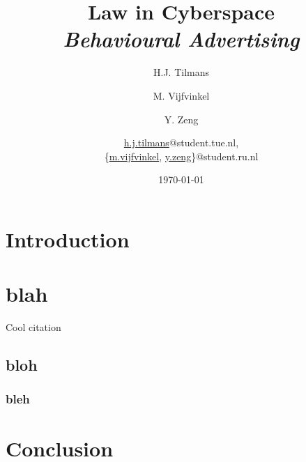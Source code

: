\documentclass[11pt]{article}
\title{\textbf{Law in Cyberspace\\ \emph{Behavioural Advertising}}}
\author{
	H.J. Tilmans
	\and M. Vijfvinkel
	\and Y. Zeng
	\and
	\href{mailto:h.j.tilmans@student.tue.nl}{h.j.tilmans}@student.tue.nl,\\
	\{\href{mailto:m.vijfvinkel@student.ru.nl}{m.vijfvinkel},
	\href{mailto:y.zeg@student.ru.nl}{y.zeng}\}@student.ru.nl
}
\date{\today}
\begin{document}
\maketitle
\section{Introduction}

\section{blah}
Cool citation \cite{test}
\subsection{bloh}
\subsubsection{bleh}

\section{Conclusion}



\end{document}
